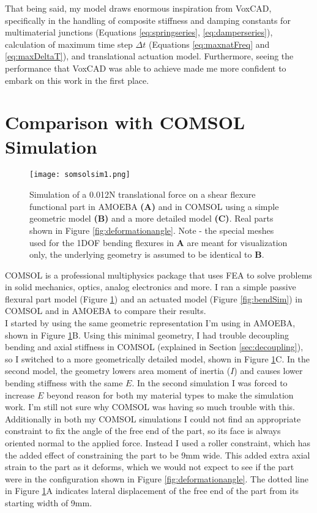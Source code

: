 {That being said, my model draws enormous inspiration from VoxCAD, specifically in the handling of composite stiffness and damping constants for multimaterial junctions (Equations \ref{eq:springseries}, \ref{eq:damperseries}), calculation of maximum time step $\Delta t$ (Equations \ref{eq:maxnatFreq} and \ref{eq:maxDeltaT}), and translational actuation model.  Furthermore, seeing the performance that VoxCAD was able to achieve made me more confident to embark on this work in the first place. 

\section{Comparison with COMSOL Simulation}

\begin{figure}
  \texttt{[image: somsolsim1.png]}
  \caption{Simulation of a 0.012N translational force on a shear flexure functional part in AMOEBA \textbf{(A)} and in COMSOL using a simple geometric model \textbf{(B)} and a more detailed model \textbf{(C)}.  Real parts shown in Figure \ref{fig:deformationangle}.  Note - the special meshes used for the 1DOF bending flexures in \textbf{A} are meant for visualization only, the underlying geometry is assumed to be identical to \textbf{B}.}
  \label{fig:somsolsim1}
\end{figure}


COMSOL is a professional multiphysics package that uses FEA to solve problems in solid mechanics, optics, analog electronics and more.  I ran a simple passive flexural part model (Figure \ref{fig:somsolsim1}) and an actuated model (Figure \ref{fig:bendSim}) in COMSOL and in AMOEBA to compare their results.\\

I started by using the same geometric representation I'm using in AMOEBA, shown in Figure \ref{fig:somsolsim1}B. Using this minimal geometry, I had trouble decoupling bending and axial stiffness in COMSOL (explained in Section \ref{sec:decoupling}), so I switched to a more geometrically detailed model, shown in Figure \ref{fig:somsolsim1}C.  In the second model, the geometry lowers area moment of inertia ($I$) and causes lower bending stiffness with the same $E$.  In the second simulation I was forced to increase $E$ beyond reason for both my material types to make the simulation work.  I'm still not sure why COMSOL was having so much trouble with this.\\

Additionally in both my COMSOL simulations I could not find an appropriate constraint to fix the angle of the free end of the part, so its face is always oriented normal to the applied force.  Instead I used a roller constraint, which has the added effect of constraining the part to be 9mm wide.  This added extra axial strain to the part as it deforms, which we would not expect to see if the part were in the configuration shown in Figure \ref{fig:deformationangle}.  The dotted line in Figure \ref{fig:somsolsim1}A indicates lateral displacement of the free end of the part from its starting width of 9mm.

}
